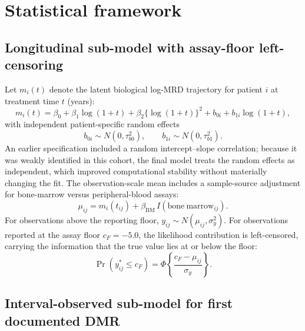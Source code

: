 \documentclass[11pt]{article}
\begin{document}
\section{Statistical framework}
\label{sec:methods}

\subsection{Longitudinal sub-model with assay-floor left-censoring}
\label{sec:long}

Let $m_i(t)$ denote the latent biological log-MRD trajectory for patient
$i$ at treatment time $t$ (years):
\[
m_i(t)=\beta_0+\beta_1\log(1+t)+\beta_2\{\log(1+t)\}^2
+b_{0i}+b_{1i}\log(1+t),
\]
with independent patient-specific random effects
\[
b_{0i}\sim N(0,\tau_{b0}^2), \qquad b_{1i}\sim N(0,\tau_{b1}^2).
\]
An earlier specification included a random intercept--slope correlation;
because it was weakly identified in this cohort, the final model treats the
random effects as independent, which improved computational stability
without materially changing the fit. The observation-scale mean includes a
sample-source adjustment for bone-marrow versus peripheral-blood assays:
\[
\mu_{ij}=m_i(t_{ij})+\beta_{\mathrm{BM}}\,I(\mathrm{bone\ marrow}_{ij}).
\]
For observations above the reporting floor,
$y_{ij}\sim N(\mu_{ij},\sigma_y^2)$. For observations reported at the
assay floor $c_F=-5.0$, the likelihood contribution is left-censored,
carrying the information that the true value lies at or below the floor:
\[
\Pr(y_{ij}^{\ast}\le c_F)=
\Phi\!\left\{\frac{c_F-\mu_{ij}}{\sigma_y}\right\}.
\]

\subsection{Interval-observed sub-model for first documented DMR}
\label{sec:interval}
\end{document}
